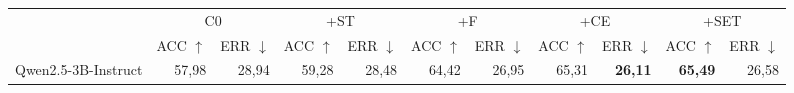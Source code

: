 \begin{tabular}{l*{5}{rr}}\toprule
 & \multicolumn{2}{c}{C0} & \multicolumn{2}{c}{+ST} & \multicolumn{2}{c}{+F} & \multicolumn{2}{c}{+CE} & \multicolumn{2}{c}{+SET}\\
 & ACC $\uparrow$ & ERR $\downarrow$ & ACC $\uparrow$ & ERR $\downarrow$ & ACC $\uparrow$ & ERR $\downarrow$ & ACC $\uparrow$ & ERR $\downarrow$ & ACC $\uparrow$ & ERR $\downarrow$\\\midrule
Qwen2.5-3B-Instruct & 57,98 & 28,94 & 59,28 & 28,48 & 64,42 & 26,95 & 65,31 & \textbf{26,11} & \textbf{65,49} & 26,58\\
\bottomrule\end{tabular}

